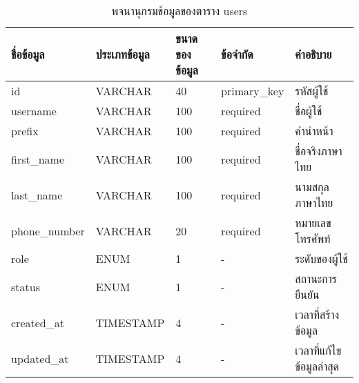 \begin{table}[H]
    \caption{พจนานุกรมข้อมูลของตาราง users}
    \label{tab:database-users}
    \begin{tabularx}{\textwidth}{ | p{2.25cm} | p{2.20cm} | p{2.45cm} | p{2cm} | X | }
    \hline
    \textbf{ชื่อข้อมูล} & \textbf{ประเภทข้อมูล} & \textbf{ขนาดของข้อมูล} & \textbf{ข้อจำกัด} & \textbf{คำอธิบาย} \\
    \hline
    id & VARCHAR & 40 & primary\_key & รหัสผู้ใช้ \\
    \hline
    username & VARCHAR & 100 & required & ชื่อผู้ใช้ \\
    \hline
    prefix & VARCHAR & 100 & required & คำนำหน้า \\
    \hline
    first\_name & VARCHAR & 100 & required & ชื่อจริงภาษาไทย \\
    \hline
    last\_name & VARCHAR & 100 & required & นามสกุลภาษาไทย \\
    \hline
    phone\_number & VARCHAR & 20 & required & หมายเลขโทรศัพท์ \\
    \hline
    role & ENUM & 1 & - & ระดับของผู้ใช้ \\
    \hline
    status & ENUM & 1 & - & สถานะการยืนยัน \\
    \hline
    created\_at & TIMESTAMP & 4 & - & เวลาที่สร้างข้อมูล \\
    \hline
    updated\_at & TIMESTAMP & 4 & - & เวลาที่แก้ไขข้อมูลล่าสุด \\
    \hline
    \end{tabularx}
\end{table}
